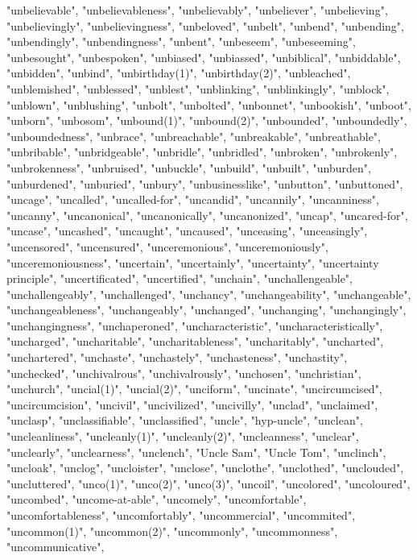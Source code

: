 "unbelievable",
"unbelievableness",
"unbelievably",
"unbeliever",
"unbelieving",
"unbelievingly",
"unbelievingness",
"unbeloved",
"unbelt",
"unbend",
"unbending",
"unbendingly",
"unbendingness",
"unbent",
"unbeseem",
"unbeseeming",
"unbesought",
"unbespoken",
"unbiased",
"unbiassed",
"unbiblical",
"unbiddable",
"unbidden",
"unbind",
"unbirthday(1)",
"unbirthday(2)",
"unbleached",
"unblemished",
"unblessed",
"unblest",
"unblinking",
"unblinkingly",
"unblock",
"unblown",
"unblushing",
"unbolt",
"unbolted",
"unbonnet",
"unbookish",
"unboot",
"unborn",
"unbosom",
"unbound(1)",
"unbound(2)",
"unbounded",
"unboundedly",
"unboundedness",
"unbrace",
"unbreachable",
"unbreakable",
"unbreathable",
"unbribable",
"unbridgeable",
"unbridle",
"unbridled",
"unbroken",
"unbrokenly",
"unbrokenness",
"unbruised",
"unbuckle",
"unbuild",
"unbuilt",
"unburden",
"unburdened",
"unburied",
"unbury",
"unbusinesslike",
"unbutton",
"unbuttoned",
"uncage",
"uncalled",
"uncalled-for",
"uncandid",
"uncannily",
"uncanniness",
"uncanny",
"uncanonical",
"uncanonically",
"uncanonized",
"uncap",
"uncared-for",
"uncase",
"uncashed",
"uncaught",
"uncaused",
"unceasing",
"unceasingly",
"uncensored",
"uncensured",
"unceremonious",
"unceremoniously",
"unceremoniousness",
"uncertain",
"uncertainly",
"uncertainty",
"uncertainty principle",
"uncertificated",
"uncertified",
"unchain",
"unchallengeable",
"unchallengeably",
"unchallenged",
"unchancy",
"unchangeability",
"unchangeable",
"unchangeableness",
"unchangeably",
"unchanged",
"unchanging",
"unchangingly",
"unchangingness",
"unchaperoned",
"uncharacteristic",
"uncharacteristically",
"uncharged",
"uncharitable",
"uncharitableness",
"uncharitably",
"uncharted",
"unchartered",
"unchaste",
"unchastely",
"unchasteness",
"unchastity",
"unchecked",
"unchivalrous",
"unchivalrously",
"unchosen",
"unchristian",
"unchurch",
"uncial(1)",
"uncial(2)",
"unciform",
"uncinate",
"uncircumcised",
"uncircumcision",
"uncivil",
"uncivilized",
"uncivilly",
"unclad",
"unclaimed",
"unclasp",
"unclassifiable",
"unclassified",
"uncle",
"hyp-uncle",
"unclean",
"uncleanliness",
"uncleanly(1)",
"uncleanly(2)",
"uncleanness",
"unclear",
"unclearly",
"unclearness",
"unclench",
"Uncle Sam",
"Uncle Tom",
"unclinch",
"uncloak",
"unclog",
"uncloister",
"unclose",
"unclothe",
"unclothed",
"unclouded",
"uncluttered",
"unco(1)",
"unco(2)",
"unco(3)",
"uncoil",
"uncolored",
"uncoloured",
"uncombed",
"uncome-at-able",
"uncomely",
"uncomfortable",
"uncomfortableness",
"uncomfortably",
"uncommercial",
"uncommited",
"uncommon(1)",
"uncommon(2)",
"uncommonly",
"uncommonness",
"uncommunicative",
